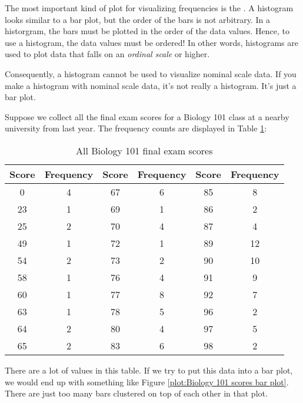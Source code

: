 \documentclass[../../../main.tex]{subfiles}
\begin{document}
The most important kind of plot for visualizing frequencies is the . A histogram looks similar to a bar plot, but the order of the bars is not arbitrary. In a historgram, the bars must be plotted in the order of the data values. Hence, to use a histogram, the data values must be ordered! In other words, histograms are used to plot data that falls on an \emph{ordinal scale} or higher. 

Consequently, a histogram cannot be used to visualize nominal scale data. If you make a histogram with nominal scale data, it's not really a histogram. It's just a bar plot.

Suppose we collect all the final exam scores for a Biology 101 class at a nearby university from last year. The frequency counts are displayed in Table \ref{table:Biology 101 scores}:

\begin{table}[ht]
  \begin{tabular}{| c | c || c | c || c | c |}
    \hline
    \textbf{Score} & \textbf{Frequency} & \textbf{Score} & \textbf{Frequency} & \textbf{Score} & \textbf{Frequency} \\ \hline
    0 & 4 & 67 & 6 & 85 & 8 \\ \hline
    23 & 1 & 69 & 1 & 86 & 2 \\ \hline
    25 & 2 & 70 & 4 & 87 & 4 \\ \hline
    49 & 1 & 72 & 1 & 89 & 12 \\ \hline
    54 & 2 & 73 & 2 & 90 & 10 \\ \hline
    58 & 1 & 76 & 4 & 91 & 9 \\ \hline
    60 & 1 & 77 & 8 & 92 & 7 \\ \hline
    63 & 1 & 78 & 5 & 96 & 2 \\ \hline
    64 & 2 & 80 & 4 & 97 & 5 \\ \hline
    65 & 2 & 83 & 6 & 98 & 2 \\ \hline
  \end{tabular}
  \caption{\label{table:Biology 101 scores}All Biology 101 final exam scores}  
\end{table}

There are a lot of values in this table. If we try to put this data into a bar plot, we would end up with something like Figure \ref{plot:Biology 101 scores bar plot}. There are just too many bars clustered on top of each other in that plot.
\end{document}
